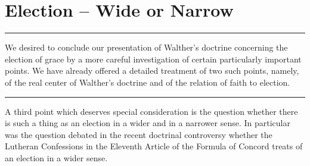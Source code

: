 \chapter{Election -- Wide or Narrow}
\hrule
\vspace{.30cm}
We desired to conclude our presentation of Walther's doctrine concerning the election of grace by a more careful investigation of certain particularly important points. We have already offered a detailed treatment of two such points, namely, of the real center of Walther's doctrine and of the relation of faith to election.
\vspace{.30cm}
\hrule
\vspace{1.25cm}
A third point which deserves special consideration is the question whether there is such a thing as an election in a wider and in a narrower sense. In particular was the question debated in the recent doctrinal controversy whether the Lutheran Confessions in the Eleventh Article of the Formula of Concord treats of an election in a wider sense.


